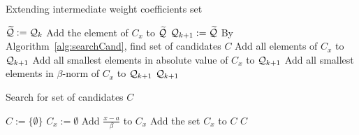 \begin{algorithm}
  \caption{Extending intermediate weight coefficients set}
    \label{alg:extendWeightCoefSet}
  \begin{algorithmic}[1]
    \STATE $\widetilde{\mathcal{Q}}:=\mathcal{Q}_{k}$
		    	\STATE Add the element of $C_x$ to $\widetilde{\mathcal{Q}}$
			\ENDIF
		\ENDFOR
	\ENDIF
    \STATE $\mathcal{Q}_{k+1}:=\widetilde{\mathcal{Q}}$
    \STATE By Algorithm~\ref{alg:searchCand}, find set of candidates $C$
	        	\STATE Add all elements of $C_x$ to $\mathcal{Q}_{k+1}$
	        	\STATE Add all smallest elements in absolute value of $C_x$ to $\mathcal{Q}_{k+1}$ 
	        	\STATE Add all smallest elements in $\beta$-norm of $C_x$ to $\mathcal{Q}_{k+1}$
	        \ENDIF
        \ENDIF
    \ENDFOR
    \RETURN $\mathcal{Q}_{k+1}$
  \end{algorithmic}
\end{algorithm}



\begin{algorithm}
  \caption{Search for set of candidates $C$}
    \label{alg:searchCand}
  \begin{algorithmic}[1]
    \STATE $C:=\{\emptyset\}$
     \label{line:replaceBySmaller}
      \STATE $C_x:=\emptyset$
              \STATE Add $\frac{x-a}{\beta}$ to $C_x$
            \ENDIF
      \ENDFOR 
      \STATE Add the set $C_x$ to $C$
  \ENDFOR
  \RETURN $C$
  \end{algorithmic}
\end{algorithm}  
